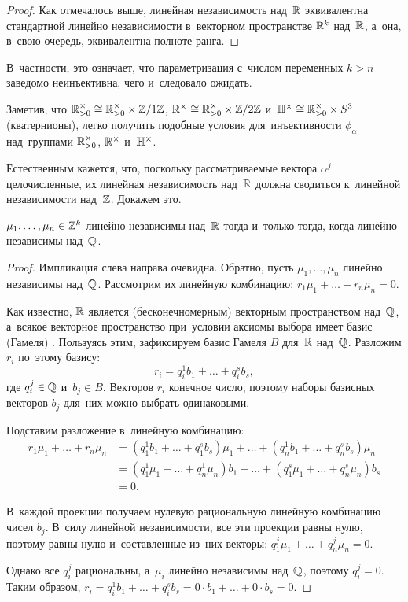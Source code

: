 \documentclass[a4paper,oneside]{article}
\begin{document}
\begin{proof}
    Как отмечалось выше, линейная независимость над~$\mathbb{R}$ эквивалентна стандартной линейно независимости
    в~векторном пространстве $\mathbb{R}^k$ над~$\mathbb{R}$, а~она, в~свою очередь, эквивалентна полноте ранга.
\end{proof}

В~частности, это означает, что параметризация с~числом переменных $k > n$ заведомо неинъективна, чего и~следовало ожидать.

Заметив, что $\mathbb{R}_{>0}^\times \cong \mathbb{R}_{>0}^\times \times \mathbb{Z} / 1\mathbb{Z}$, $\mathbb{R}^\times \cong \mathbb{R}_{>0}^\times \times \mathbb{Z} / 2 \mathbb{Z}$
и~$\mathbb{H}^\times \cong \mathbb{R}_{>0}^\times \times S^3$ (кватернионы), легко получить подобные условия для~инъективности
$\phi_\alpha$ над~группами $\mathbb{R}_{>0}^\times$, $\mathbb{R}^\times$ и~$\mathbb{H}^\times$.

Естественным кажется, что, поскольку рассматриваемые вектора $\alpha^j$ целочисленные, их линейная независимость
над~$\mathbb{R}$ должна сводиться к~линейной независимости над~$\mathbb{Z}$. Докажем это.

\begin{lemma*}
    $\mu_1, \ldots, \mu_n \in \mathbb{Z}^k$ линейно независимы над~$\mathbb{R}$ тогда и~только тогда, когда линейно независимы над~$\mathbb{Q}$.
\end{lemma*}

\begin{proof}
    Импликация слева направа очевидна. Обратно, пусть $\mu_1,\allowbreak \ldots,\allowbreak \mu_n$ линейно независимы над~$\mathbb{Q}$.
    Рассмотрим их линейную комбинацию: $r_1 \mu_1 + \ldots + r_n \mu_n = 0$.

    Как известно, $\mathbb{R}$ является (бесконечномерным) векторным пространством над~$\mathbb{Q}$, а~всякое векторное пространство
    при~условии аксиомы выбора имеет базис (Гамеля) \cite{Brbk70}. Пользуясь этим, зафиксируем базис Гамеля $B$ для~$\mathbb{R}$ над~$\mathbb{Q}$.
    Разложим $r_i$ по~этому базису:
    $$
        r_i = q_i^1 b_1 + \ldots + q_i^s b_s,
    $$
    где $q_i^j \in \mathbb{Q}$ и~$b_j \in B$. Векторов $r_i$ конечное число, поэтому наборы базисных векторов $b_j$ для~них можно выбрать одинаковыми.

    Подставим разложение в~линейную комбинацию:
    \begin{align*}
        r_1 \mu_1 + \ldots + r_n \mu_n & = (q_1^1 b_1 + \ldots + q_1^s b_s) \mu_1 + \ldots + (q_n^1 b_1 + \ldots + q_n^s b_s) \mu_n \\
                                       & = (q_1^1 \mu_1 + \ldots + q_n^1 \mu_n) b_1 + \ldots + (q_1^s \mu_1 + \ldots + q_n^s \mu_n) b_s \\
                                       & = 0.
    \end{align*}

    В~каждой проекции получаем нулевую рациональную линейную комбинацию чисел $b_j$. В~силу линейной независимости,
    все эти проекции равны нулю, поэтому равны нулю и~составленные из~них векторы: $q_1^j \mu_1 + \ldots + q_n^j \mu_n = 0$.

    Однако все $q_i^j$ рациональны, а~$\mu_i$ линейно независимы над~$\mathbb{Q}$, поэтому $q_i^j = 0$.
    Таким образом, $r_i = q_i^1 b_1 + \ldots + q_i^s b_s = 0 \cdot b_1 + \ldots + 0 \cdot b_s = 0$.
\end{proof}
\end{document}

